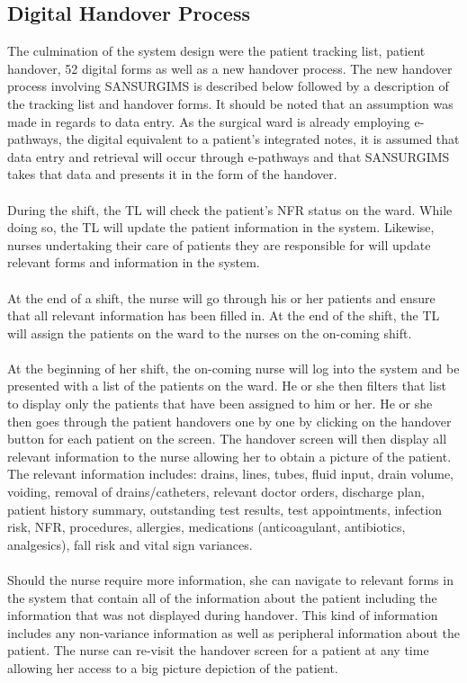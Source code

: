 \subsection{Digital Handover Process}
\label{Digital Handover Process}
The culmination of the system design were the patient tracking list, patient handover, 52 digital forms as well as a new handover process. The new handover process involving SANSURGIMS is described below followed by a description of the tracking list and handover forms. It should be noted that an assumption was made in regards to data entry. As the surgical ward is already employing e-pathways, the digital equivalent to a patient's integrated notes, it is assumed that data entry and retrieval will occur through e-pathways and that SANSURGIMS takes that data and presents it in the form of the handover.
\\ \\
During the shift, the TL will check the patient's NFR status on the ward. While doing so, the TL will update the patient information in the system. Likewise, nurses undertaking their care of patients they are responsible for will update relevant forms and information in the system. 
\\ \\
At the end of a shift, the nurse will go through his or her patients and ensure that all relevant information has been filled in. At the end of the shift, the TL will assign the patients on the ward to the nurses on the on-coming shift.
\\ \\
At the beginning of her shift, the on-coming nurse will log into the system and be presented with a list of the patients on the ward. He or she then filters that list to display only the patients that have been assigned to him or her. He or she then goes through the patient handovers one by one by clicking on the handover button for each patient on the screen. The handover screen will then display all relevant information to the nurse allowing her to obtain a picture of the patient. The relevant information includes: drains, lines, tubes, fluid input, drain volume, voiding, removal of drains/catheters, relevant doctor orders, discharge plan, patient history summary, outstanding test results, test appointments, infection risk, NFR, procedures, allergies, medications (anticoagulant, antibiotics, analgesics), fall risk and vital sign variances. 
\\ \\
Should the nurse require more information, she can navigate to relevant forms in the system that contain all of the information about the patient including the information that was not displayed during handover. This kind of information includes any non-variance information as well as peripheral information about the patient. The nurse can re-visit the handover screen for a patient at any time allowing her access to a big picture depiction of the patient.

